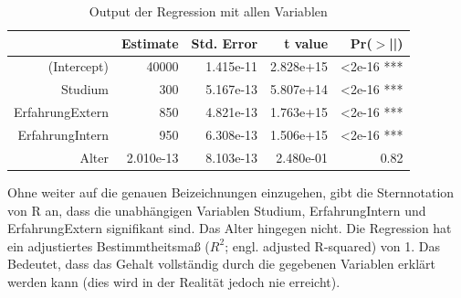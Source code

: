 

\begin{table}[h!]
\begin{tabular}{rrrrr}
  \hline
 & Estimate & Std. Error & t value & Pr($>$||) \\ 
  \hline
(Intercept) & 40000 & 1.415e-11 & 2.828e+15 & <2e-16 *** \\ 
  Studium & 300 & 5.167e-13 & 5.807e+14 & <2e-16 *** \\ 
  ErfahrungExtern & 850 & 4.821e-13 & 1.763e+15  & <2e-16 *** \\ 
  ErfahrungIntern & 950 & 6.308e-13 & 1.506e+15 & <2e-16 *** \\ 
  Alter & 2.010e-13 & 8.103e-13 & 2.480e-01 & 0.82 \\ 
\hline
\end{tabular}
\caption{Output der Regression mit allen Variablen}
\label{tab:Regression1:output}
\end{table}

Ohne weiter auf die genauen Beizeichnungen einzugehen, gibt die Sternnotation von R an, dass die unabhängigen Variablen Studium, ErfahrungIntern und ErfahrungExtern signifikant sind. Das Alter hingegen nicht. Die Regression hat ein adjustiertes Bestimmtheitsmaß ($R^2$; engl. adjusted R-squared) von 1. Das Bedeutet, dass das Gehalt vollständig durch die gegebenen Variablen erklärt werden kann (dies wird in der Realität jedoch nie erreicht).

